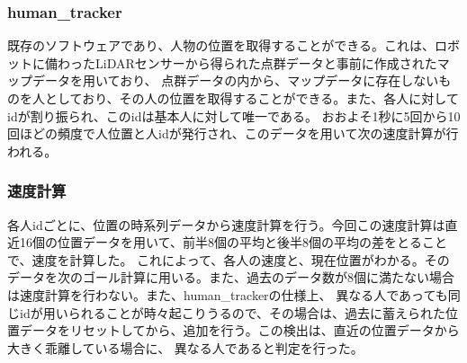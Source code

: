 \documentclass[11pt,a4j]{jreport}
\begin{document}
\subsubsection{human\_tracker}
既存のソフトウェアであり、人物の位置を取得することができる。これは、ロボットに備わったLiDARセンサーから得られた点群データと事前に作成されたマップデータを用いており、
点群データの内から、マップデータに存在しないものを人としており、その人の位置を取得することができる。また、各人に対してidが割り振られ、このidは基本人に対して唯一である。
おおよそ1秒に5回から10回ほどの頻度で人位置と人idが発行され、このデータを用いて次の速度計算が行われる。

\subsubsection{速度計算}
各人idごとに、位置の時系列データから速度計算を行う。今回この速度計算は直近16個の位置データを用いて、前半8個の平均と後半8個の平均の差をとることで、速度を計算した。
これによって、各人の速度と、現在位置がわかる。そのデータを次のゴール計算に用いる。また、過去のデータ数が8個に満たない場合は速度計算を行わない。また、human\_trackerの仕様上、
異なる人であっても同じidが用いられることが時々起こりうるので、その場合は、過去に蓄えられた位置データをリセットしてから、追加を行う。この検出は、直近の位置データから大きく乖離している場合に、
異なる人であると判定を行った。
\end{document}
